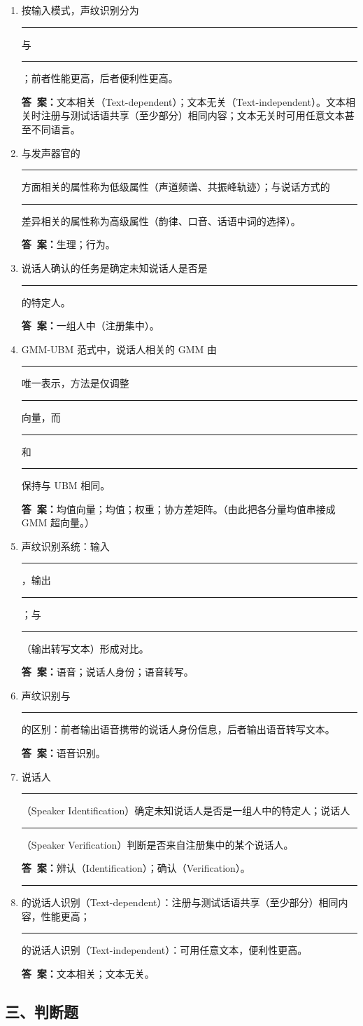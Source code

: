 \documentclass[10.5pt]{ctexart}
\newenvironment{qlist}
  {\begin{enumerate}[label={\sffamily\bfseries\color{accent}\arabic*.},leftmargin=2.4em,labelsep=0.55em,itemsep=0.62em,topsep=0.15em,parsep=0.3em,partopsep=0pt]}
  {\end{enumerate}}
\newcommand{\anslabel}{{\sffamily\bfseries\color{accent}答\ 案：}\hspace{0.35em}}
\newcommand{\ans}[1]{\par\vspace{2.15\baselineskip}\begin{ansbox}\anslabel #1\end{ansbox}}
\newcommand{\blank}{\rule[-0.42ex]{2.55em}{0.45pt}}
\begin{document}
\begin{qlist}

\item 按输入模式，声纹识别分为 \blank 与 \blank ；前者性能更高，后者便利性更高。
\ans{文本相关（Text-dependent）；文本无关（Text-independent）。文本相关时注册与测试话语共享（至少部分）相同内容；文本无关时可用任意文本甚至不同语言。}

\item 与发声器官的 \blank 方面相关的属性称为低级属性（声道频谱、共振峰轨迹）；与说话方式的 \blank 差异相关的属性称为高级属性（韵律、口音、话语中词的选择）。
\ans{生理；行为。}

\item 说话人确认的任务是确定未知说话人是否是 \blank 的特定人。
\ans{一组人中（注册集中）。}

\item GMM-UBM 范式中，说话人相关的 GMM 由 \blank 唯一表示，方法是仅调整 \blank 向量，而 \blank 和 \blank 保持与 UBM 相同。
\ans{均值向量；均值；权重；协方差矩阵。（由此把各分量均值串接成 GMM 超向量。）}

\item 声纹识别系统：输入 \blank ，输出 \blank ；与 \blank （输出转写文本）形成对比。
\ans{语音；说话人身份；语音转写。}

\item 声纹识别与 \blank 的区别：前者输出语音携带的说话人身份信息，后者输出语音转写文本。
\ans{语音识别。}

\item 说话人 \blank （Speaker Identification）确定未知说话人是否是一组人中的特定人；说话人 \blank （Speaker Verification）判断是否来自注册集中的某个说话人。
\ans{辨认（Identification）；确认（Verification）。}

\item \blank 的说话人识别（Text-dependent）：注册与测试话语共享（至少部分）相同内容，性能更高；\blank 的说话人识别（Text-independent）：可用任意文本，便利性更高。
\ans{文本相关；文本无关。}

\end{qlist}

\subsection{三、判断题}
\end{document}

